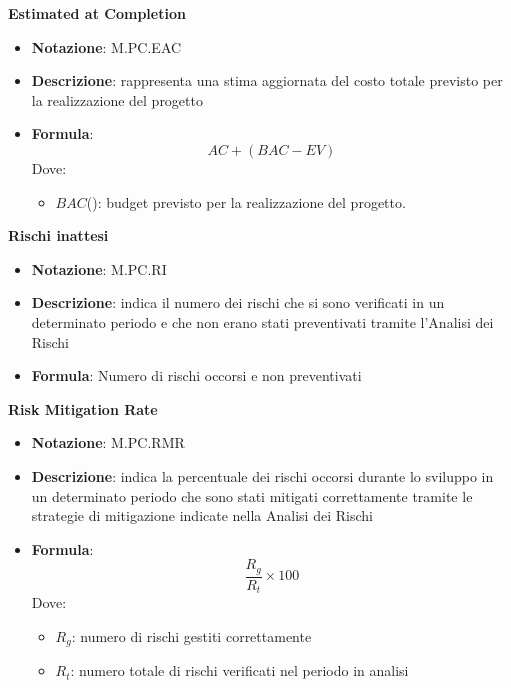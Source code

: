 \textbf{Estimated at Completion}
\begin{itemize}
    \item \textbf{Notazione}: M.PC.EAC
    \item \textbf{Descrizione}: rappresenta una stima aggiornata del costo totale previsto per la realizzazione del progetto
    \item \textbf{Formula}: 
    \begin{equation}
        AC + (BAC - EV)
    \end{equation}
    Dove:
    \begin{itemize}
        \item $BAC$(): budget previsto per la realizzazione del progetto.
    \end{itemize}
\end{itemize}

\textbf{Rischi inattesi}
\begin{itemize}
    \item \textbf{Notazione}: M.PC.RI
    \item \textbf{Descrizione}: indica il numero dei rischi che si sono verificati in un determinato periodo e che non erano stati preventivati tramite l'Analisi dei Rischi
    \item \textbf{Formula}: Numero di rischi occorsi e non preventivati
\end{itemize}
\textbf{Risk Mitigation Rate}
\begin{itemize}
    \item \textbf{Notazione}: M.PC.RMR
    \item \textbf{Descrizione}: indica la percentuale dei rischi occorsi durante lo sviluppo in un determinato periodo che sono stati mitigati correttamente tramite le strategie di mitigazione indicate nella Analisi dei Rischi
    \item \textbf{Formula}: 
    \begin{equation}
        \frac{R_g}{R_t} \times 100
    \end{equation}
    Dove:
    \begin{itemize}
        \item $R_g$: numero di rischi gestiti correttamente
        \item $R_t$: numero totale di rischi verificati nel periodo in analisi
    \end{itemize}
\end{itemize}

